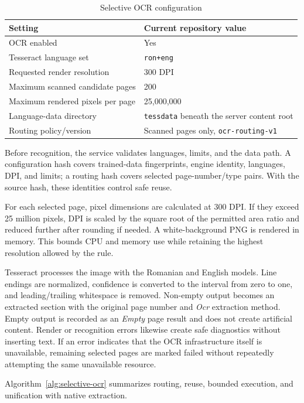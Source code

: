 \begin{table}[!htbp]
	\centering
	\small
	\caption{Selective OCR configuration}
	\label{tab:ocr-configuration}
	\begin{tabular}{p{6.8cm}p{6.0cm}}
		\toprule
		Setting & Current repository value \\
		\midrule
		OCR enabled & Yes \\
		Tesseract language set & \texttt{ron+eng} \\
		Requested render resolution & 300 DPI \\
		Maximum scanned candidate pages & 200 \\
		Maximum rendered pixels per page & 25,000,000 \\
		Language-data directory & \texttt{tessdata} beneath the server content root \\
		Routing policy/version & Scanned pages only, \texttt{ocr-routing-v1} \\
		\bottomrule
	\end{tabular}
\end{table}

Before recognition, the service validates languages, limits, and the data path.
A configuration hash covers trained-data fingerprints, engine identity,
languages, DPI, and limits; a routing hash covers selected page-number/type
pairs. With the source hash, these identities control safe reuse.

For each selected page, pixel dimensions are calculated at 300 DPI. If they
exceed 25 million pixels, DPI is scaled by the square root of the permitted area
ratio and reduced further after rounding if needed. A white-background PNG is
rendered in memory. This bounds CPU and memory use while retaining the highest
resolution allowed by the rule.

Tesseract processes the image with the Romanian and English models. Line
endings are normalized, confidence is converted to the interval from zero to
one, and leading/trailing whitespace is removed. Non-empty output becomes an
extracted section with the original page number and \emph{Ocr} extraction
method. Empty output is recorded as an \emph{Empty} page result and does not
create artificial content. Render or recognition errors likewise create safe
diagnostics without inserting text. If an error indicates that the OCR
infrastructure itself is unavailable, remaining selected pages are marked
failed without repeatedly attempting the same unavailable resource.

Algorithm~\ref{alg:selective-ocr} summarizes routing, reuse, bounded execution,
and unification with native extraction.

